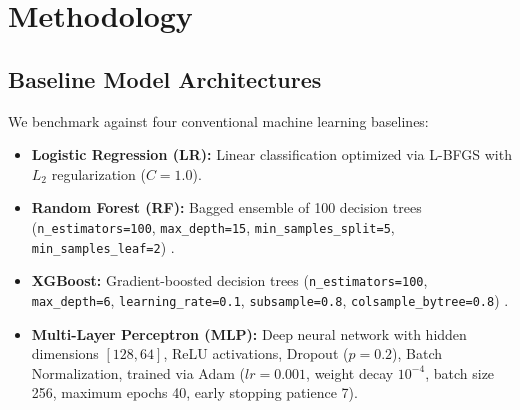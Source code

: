 \documentclass[conference]{IEEEtran}
\begin{document}
\section{Methodology}

\subsection{Baseline Model Architectures}
We benchmark against four conventional machine learning baselines:
\begin{itemize}
    \item \textbf{Logistic Regression (LR):} Linear classification optimized via L-BFGS with $L_2$ regularization ($C = 1.0$).
    \item \textbf{Random Forest (RF):} Bagged ensemble of 100 decision trees (\texttt{n\_estimators=100}, \texttt{max\_depth=15}, \texttt{min\_samples\_split=5}, \texttt{min\_samples\_leaf=2}) \cite{breiman2001random}.
    \item \textbf{XGBoost:} Gradient-boosted decision trees (\texttt{n\_estimators=100}, \texttt{max\_depth=6}, \texttt{learning\_rate=0.1}, \texttt{subsample=0.8}, \texttt{colsample\_bytree=0.8}) \cite{chen2016xgboost}.
    \item \textbf{Multi-Layer Perceptron (MLP):} Deep neural network with hidden dimensions $[128, 64]$, ReLU activations, Dropout ($p=0.2$), Batch Normalization, trained via Adam ($lr=0.001$, weight decay $10^{-4}$, batch size 256, maximum epochs 40, early stopping patience 7).
\end{itemize}
\end{document}
